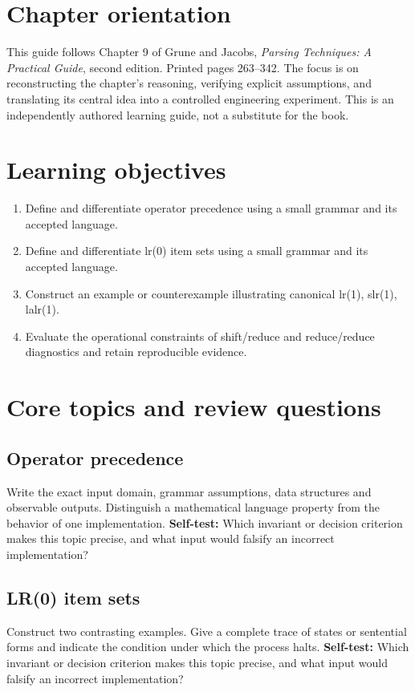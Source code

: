 \documentclass[11pt,letterpaper]{article}
\begin{document}
\makedoctitle\makedocsummary
\tableofcontents\clearpage
\section{Chapter orientation}
This guide follows Chapter 9 of Grune and Jacobs, \emph{Parsing Techniques: A Practical Guide}, second edition. Printed pages 263--342. The focus is on reconstructing the chapter's reasoning, verifying explicit assumptions, and translating its central idea into a controlled engineering experiment. This is an independently authored learning guide, not a substitute for the book.
\section{Learning objectives}
\begin{enumerate}
\item Define and differentiate operator precedence using a small grammar and its accepted language.
\item Define and differentiate lr(0) item sets using a small grammar and its accepted language.
\item Construct an example or counterexample illustrating canonical lr(1), slr(1), lalr(1).
\item Evaluate the operational constraints of shift/reduce and reduce/reduce diagnostics and retain reproducible evidence.
\end{enumerate}
\section{Core topics and review questions}
\subsection{Operator precedence}
Write the exact input domain, grammar assumptions, data structures and observable outputs. Distinguish a mathematical language property from the behavior of one implementation.
\textbf{Self-test:} Which invariant or decision criterion makes this topic precise, and what input would falsify an incorrect implementation?
\subsection{LR(0) item sets}
Construct two contrasting examples. Give a complete trace of states or sentential forms and indicate the condition under which the process halts.
\textbf{Self-test:} Which invariant or decision criterion makes this topic precise, and what input would falsify an incorrect implementation?
\end{document}
